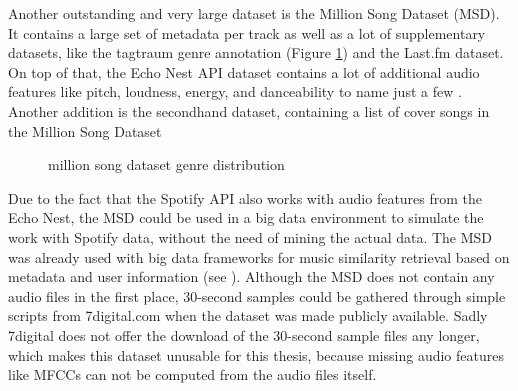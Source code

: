 Another outstanding and very large dataset is the Million Song Dataset (MSD)\cite{msd1}. 
It contains a large set of metadata per track as well as a lot of supplementary datasets, like the tagtraum genre annotation (Figure \ref{msddist})\cite{msd5} and the Last.fm dataset\cite{msd2}. On top of that, the Echo Nest API dataset contains a lot of additional audio features like pitch, loudness, energy, and danceability to name just a few \cite{msd3}. 
Another addition is the secondhand dataset, containing a list of cover songs in the Million Song Dataset\cite{msd6}
\begin{figure}[thpb]
	\centering
	\caption{million song dataset genre distribution \cite[p. 6]{msd5}}
	\label{msddist}
\end{figure}
\FloatBarrier
\noindent Due to the fact that the Spotify API\cite{spotifyapi1} also works with audio features from the Echo Nest\cite{echonest1}, the MSD could be used in a big data environment to simulate the work with Spotify data, without the need of mining the actual data. The MSD was already used with big data frameworks for music similarity retrieval based on metadata and user information (see \cite{msd4}). Although the MSD does not contain any audio files in the first place, 30-second samples could be gathered through simple scripts from 7digital.com when the dataset was made publicly available. Sadly 7digital does not offer the download of the 30-second sample files any longer, which makes this dataset unusable for this thesis, because missing audio features like MFCCs can not be computed from the audio files itself. 
